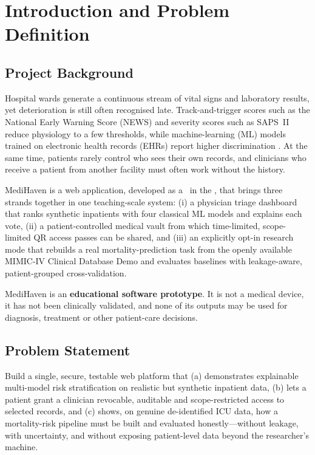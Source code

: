 \chapter{Introduction and Problem Definition}
\label{ch:intro}

\section{Project Background}
Hospital wards generate a continuous stream of vital signs and laboratory results, yet deterioration is
still often recognised late. Track-and-trigger scores such as the National Early Warning Score (NEWS)
\cite{smith2013news} and severity scores such as SAPS~II \cite{legall1993sapsii} reduce physiology to a
few thresholds, while machine-learning (ML) models trained on electronic health records (EHRs) report
higher discrimination \cite{rajkomar2018scalable,purushotham2018benchmarking}. At the same time, patients
rarely control who sees their own records, and clinicians who receive a patient from another facility
must often work without the history.

MediHaven is a web application, developed as a \CourseName\ in the \Department, that brings three
strands together in one teaching-scale system: (i) a physician triage dashboard that ranks synthetic
inpatients with four classical ML models and explains each vote, (ii) a patient-controlled medical vault
from which time-limited, scope-limited QR access passes can be shared, and (iii) an explicitly opt-in
research mode that rebuilds a real mortality-prediction task from the openly available MIMIC-IV Clinical
Database Demo \cite{johnson2023mimicivdemo,johnson2023mimiciv} and evaluates baselines with
leakage-aware, patient-grouped cross-validation.

MediHaven is an \textbf{educational software prototype}. It is not a medical device, it has not been
clinically validated, and none of its outputs may be used for diagnosis, treatment or other patient-care
decisions.

\section{Problem Statement}
Build a single, secure, testable web platform that (a) demonstrates explainable multi-model risk
stratification on realistic but synthetic inpatient data, (b) lets a patient grant a clinician
revocable, auditable and scope-restricted access to selected records, and (c) shows, on genuine
de-identified ICU data, how a mortality-risk pipeline must be built and evaluated honestly---without
leakage, with uncertainty, and without exposing patient-level data beyond the researcher's machine.

